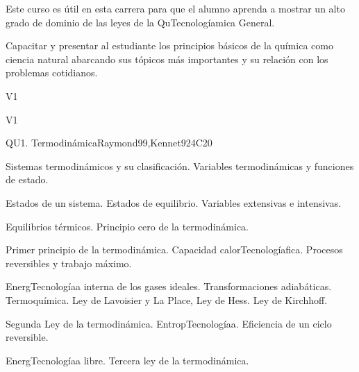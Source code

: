 \begin{syllabus}


\begin{justification}
Este curso es útil en esta carrera para que el alumno aprenda a mostrar un alto grado de dominio de las leyes de la QuTecnologíamica General.
\end{justification}

\begin{goals}
\item Capacitar y presentar al estudiante los principios básicos de la química como ciencia natural abarcando sus tópicos más importantes y su relación con los problemas cotidianos.
\end{goals}

\begin{outcomes}{V1}
\item {}
\item {}
\end{outcomes}

\begin{competences}{V1}
    \item {}
\end{competences}

\begin{unit}{QU1. Termodinámica}{}{Raymond99,Kennet92}{4}{C20}
\begin{topics}
      \item Sistemas termodinámicos y su clasificación. Variables termodinámicas y funciones de estado.
      \item Estados de un sistema. Estados de equilibrio. Variables extensivas e intensivas.
      \item Equilibrios térmicos. Principio cero de la termodinámica.
      \item Primer principio de la termodinámica. Capacidad calorTecnologíafica. Procesos reversibles y trabajo máximo.
      \item EnergTecnologíaa interna de los gases ideales. Transformaciones adiabáticas. Termoquímica. Ley de Lavoisier y La Place, Ley de Hess. Ley de Kirchhoff.
      \item Segunda Ley de la termodinámica. EntropTecnologíaa. Eficiencia de un ciclo reversible.
	\item EnergTecnologíaa libre. Tercera ley de la termodinámica.
   \end{topics}


\end{unit}
\end{syllabus}
